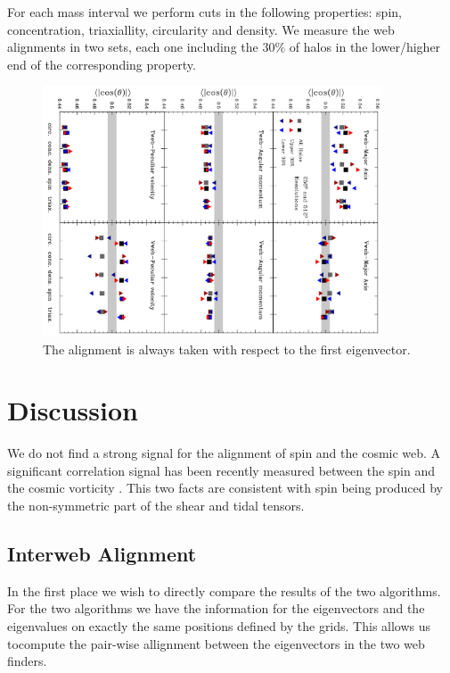 \documentclass[useAMS,usenatbib]{mn2e}
\begin{document}
For each mass interval we perform cuts in the following properties:
spin, concentration, triaxiallity, circularity  and density. We
measure the web alignments in two sets, each one including the $30\%$
of halos in the lower/higher end of the corresponding property.


\begin{figure}
\includegraphics[width=0.90\textwidth,angle=90]{all_cuts.pdf}
\caption{The alignment is always taken with respect to the first eigenvector.}
\end{figure}
\section{Discussion}
\label{sec:discussion}


We do not find a strong signal for the alignment of spin and the
cosmic web. A significant correlation signal has been recently
measured between the spin and the cosmic vorticity
\citep{Libeskind2013a,Laigle2013}. This two facts are consistent with
spin being produced by the non-symmetric part of the shear and tidal
tensors.  



\subsection{Interweb Alignment}

In the first place we wish to directly compare the results of the two
algorithms. For the two algorithms we have the information for the
eigenvectors and the eigenvalues on exactly the same positions defined
by the grids. This allows us tocompute the pair-wise allignment
between the eigenvectors in the two web finders. 
\end{document}
